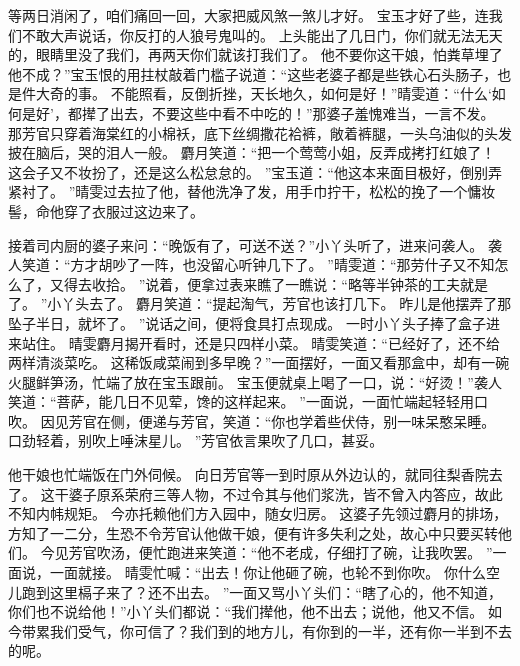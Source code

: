 等两日消闲了，咱们痛回一回，大家把威风煞一煞儿才好。
宝玉才好了些，连我们不敢大声说话，你反打的人狼号鬼叫的。
上头能出了几日门，你们就无法无天的，眼睛里没了我们，再两天你们就该打我们了。
他不要你这干娘，怕粪草埋了他不成？”宝玉恨的用拄杖敲着门槛子说道：“这些老婆子都是些铁心石头肠子，也是件大奇的事。
不能照看，反倒折挫，天长地久，如何是好！”晴雯道：“什么‘如何是好’，都撵了出去，不要这些中看不中吃的！”那婆子羞愧难当，一言不发。
那芳官只穿着海棠红的小棉袄，底下丝绸撒花袷裤，敞着裤腿，一头乌油似的头发披在脑后，哭的泪人一般。
麝月笑道：“把一个莺莺小姐，反弄成拷打红娘了！
这会子又不妆扮了，还是这么松怠怠的。
”宝玉道：“他这本来面目极好，倒别弄紧衬了。
”晴雯过去拉了他，替他洗净了发，用手巾拧干，松松的挽了一个慵妆髻，命他穿了衣服过这边来了。
\par
接着司内厨的婆子来问：“晚饭有了，可送不送？”小丫头听了，进来问袭人。
袭人笑道：“方才胡吵了一阵，也没留心听钟几下了。
”晴雯道：“那劳什子又不知怎么了，又得去收拾。
”说着，便拿过表来瞧了一瞧说：“略等半钟茶的工夫就是了。
”小丫头去了。
麝月笑道：“提起淘气，芳官也该打几下。
昨儿是他摆弄了那坠子半日，就坏了。
”说话之间，便将食具打点现成。
一时小丫头子捧了盒子进来站住。
晴雯麝月揭开看时，还是只四样小菜。
晴雯笑道：“已经好了，还不给两样清淡菜吃。
这稀饭咸菜闹到多早晚？”一面摆好，一面又看那盒中，却有一碗火腿鲜笋汤，忙端了放在宝玉跟前。
宝玉便就桌上喝了一口，说：“好烫！”袭人笑道：“菩萨，能几日不见荤，馋的这样起来。
”一面说，一面忙端起轻轻用口吹。
因见芳官在侧，便递与芳官，笑道：“你也学着些伏侍，别一味呆憨呆睡。
口劲轻着，别吹上唾沫星儿。
”芳官依言果吹了几口，甚妥。
\par
他干娘也忙端饭在门外伺候。
向日芳官等一到时原从外边认的，就同往梨香院去了。
这干婆子原系荣府三等人物，不过令其与他们浆洗，皆不曾入内答应，故此不知内帏规矩。
今亦托赖他们方入园中，随女归房。
这婆子先领过麝月的排场，方知了一二分，生恐不令芳官认他做干娘，便有许多失利之处，故心中只要买转他们。
今见芳官吹汤，便忙跑进来笑道：“他不老成，仔细打了碗，让我吹罢。
”一面说，一面就接。
晴雯忙喊：“出去！你让他砸了碗，也轮不到你吹。
你什么空儿跑到这里槅子来了？还不出去。
”一面又骂小丫头们：“瞎了心的，他不知道，你们也不说给他！”小丫头们都说：“我们撵他，他不出去；说他，他又不信。
如今带累我们受气，你可信了？我们到的地方儿，有你到的一半，还有你一半到不去的呢。
